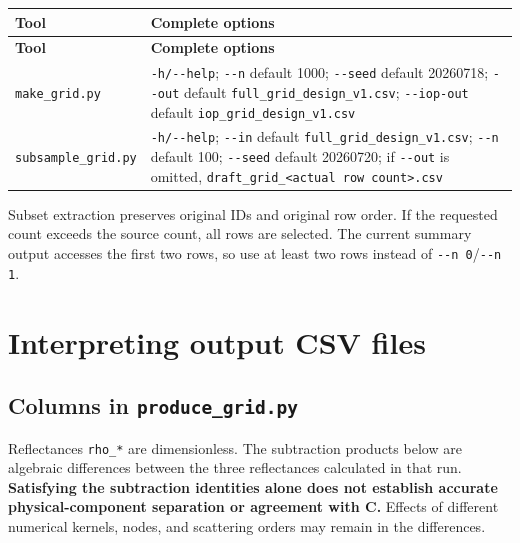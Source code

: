 {\TableFont
\begin{longtable}{@{}>{\raggedright\arraybackslash}p{}>{\raggedright\arraybackslash}p{}@{}}
\toprule
\textbf{Tool} & \textbf{Complete options} \\
\midrule
\endfirsthead
\toprule
\textbf{Tool} & \textbf{Complete options} \\
\midrule
\endhead
\bottomrule
\endfoot
\texttt{make\_\allowbreak{}grid.\allowbreak{}py} & \texttt{-\allowbreak{}h/\allowbreak{}-\allowbreak{}-\allowbreak{}help}; \texttt{-\allowbreak{}-\allowbreak{}n} default 1000; \texttt{-\allowbreak{}-\allowbreak{}seed} default 20260718; \texttt{-\allowbreak{}-\allowbreak{}out} default \texttt{full\_\allowbreak{}grid\_\allowbreak{}design\_\allowbreak{}v1.\allowbreak{}csv}; \texttt{-\allowbreak{}-\allowbreak{}iop-\allowbreak{}out} default \texttt{iop\_\allowbreak{}grid\_\allowbreak{}design\_\allowbreak{}v1.\allowbreak{}csv} \\
\texttt{subsample\_\allowbreak{}grid.\allowbreak{}py} & \texttt{-\allowbreak{}h/\allowbreak{}-\allowbreak{}-\allowbreak{}help}; \texttt{-\allowbreak{}-\allowbreak{}in} default \texttt{full\_\allowbreak{}grid\_\allowbreak{}design\_\allowbreak{}v1.\allowbreak{}csv}; \texttt{-\allowbreak{}-\allowbreak{}n} default 100; \texttt{-\allowbreak{}-\allowbreak{}seed} default 20260720; if \texttt{-\allowbreak{}-\allowbreak{}out} is omitted, \texttt{draft\_\allowbreak{}grid\_\allowbreak{}<actual row coun\allowbreak{}t>.\allowbreak{}csv} \\
\end{longtable}
}

Subset extraction preserves original IDs and original row order. If the requested count exceeds the source count, all rows are selected. The current summary output accesses the first two rows, so use at least two rows instead of \texttt{-\allowbreak{}-\allowbreak{}n 0}/\texttt{-\allowbreak{}-\allowbreak{}n 1}.

\section{Interpreting output CSV files}
\label{sec:auto:06_python_batch:8}
\subsection{Columns in \texttt{produce\_\allowbreak{}grid.\allowbreak{}py}}
\label{sec:auto:06_python_batch:8.1}
Reflectances \texttt{rho\_\allowbreak{}*} are dimensionless. The subtraction products below are algebraic differences between the three reflectances calculated in that run. \textbf{Satisfying the subtraction identities alone does not establish accurate physical-component separation or agreement with C.} Effects of different numerical kernels, nodes, and scattering orders may remain in the differences.


